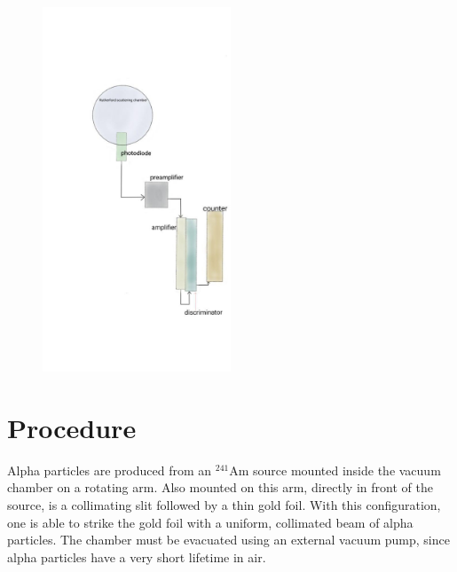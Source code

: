\documentclass[a4paper]{article}
\begin{document}
\begin{figure}[H]
\centering
\includegraphics[width=0.5\textwidth]{diagram.png}
\label{Circuit_Diagram}
\end{figure}

\section{Procedure}


\qq Alpha particles are produced from an $^{241}$Am source mounted inside the
vacuum chamber on a rotating arm. Also mounted on this arm, directly in front of
the source, is a collimating slit followed by a thin gold foil. With this
configuration, one is able to strike the gold foil with a uniform, collimated
beam of alpha particles. The chamber must be evacuated using an external vacuum
pump, since alpha particles have a very short lifetime in air.
\end{document}
